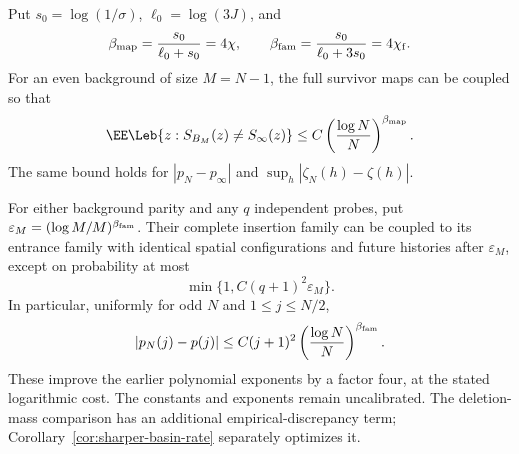 \documentclass[11pt,letterpaper]{article}
\begin{document}
\begin{theorem}
\label{thm:sharper-map-family-rates}
Put $s_0=\log(1/\sigma)$, $\ell_0=\log(3J)$, and
\[
 \beta_{\rm map}=\frac{s_0}{\ell_0+s_0}=4\chi,\qquad
 \beta_{\rm fam}=\frac{s_0}{\ell_0+3s_0}=4\chi_{\rm f}.
\]
For an even background of size $M=N-1$, the full survivor maps
can be coupled so that
\begin{equation}\label{eq:sharper-full-map-rate}
 \EE\Leb\{z:S_{B_M}(z)\ne S_\infty(z)\}
        \le C\left(\frac{\log N}{N}\right)^{\beta_{\rm map}}.
\end{equation}
The same bound holds for $|p_N-p_\infty|$ and
$\sup_h|\zeta_N(h)-\zeta(h)|$.

For either background parity and any $q$ independent probes, put
$\varepsilon_M=(\log M/M)^{\beta_{\rm fam}}$.
Their complete insertion family can be coupled to its entrance
family with identical spatial configurations and future histories
after $\varepsilon_M$, except on probability at most
\begin{equation}\label{eq:sharper-family-rate}
 \min\{1,C(q+1)^2\varepsilon_M\}.
\end{equation}
In particular, uniformly for odd $N$ and $1\le j\le N/2$,
\begin{equation}\label{eq:sharper-fixed-profile-rate}
 |p_N(j)-p(j)|\le C(j+1)^2
                         \left(\frac{\log N}{N}\right)^{\beta_{\rm fam}}.
\end{equation}
These improve the earlier polynomial exponents by a factor four,
at the stated logarithmic cost. The constants and exponents remain
uncalibrated. The deletion-mass comparison has an additional
empirical-discrepancy term; Corollary~\ref{cor:sharper-basin-rate}
separately optimizes it.
\end{theorem}
\end{document}
